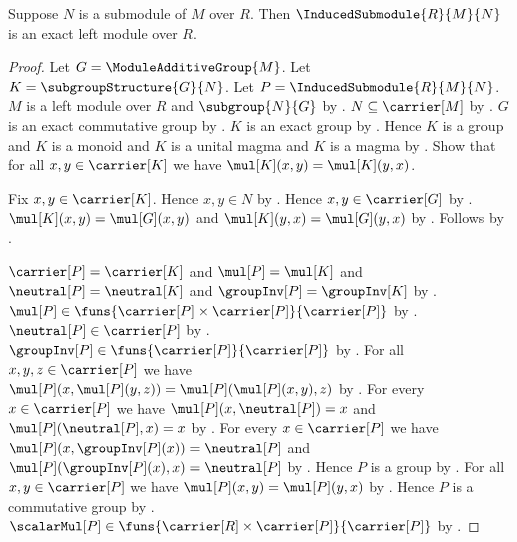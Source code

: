 \begin{theorem}\label{induced_submodule_is_exact}
    Suppose $N$ is a submodule of $M$ over $R$.
    Then $\InducedSubmodule{R}{M}{N}$ is an exact left module over $R$.
\end{theorem}
\begin{proof}
    Let $G=\ModuleAdditiveGroup{M}$.
    Let $K=\subgroupStructure{G}{N}$.
    Let $P=\InducedSubmodule{R}{M}{N}$.
    $M$ is a left module over $R$ and $\subgroup{N}{G}$ by
        .
    $N\subseteq\carrier[M]$ by .
    $G$ is an exact commutative group by
        .
    $K$ is an exact group by
        .
    Hence $K$ is a group and $K$ is a monoid and
        $K$ is a unital magma and $K$ is a magma by
        .
    Show that for all $x,y\in\carrier[K]$ we have
        $\mul[K](x,y)=\mul[K](y,x)$.
    \begin{subproof}
        Fix $x,y\in\carrier[K]$.
        Hence $x,y\in N$ by .
        Hence $x,y\in\carrier[G]$ by
            .
        $\mul[K](x,y)=\mul[G](x,y)$ and
            $\mul[K](y,x)=\mul[G](y,x)$ by
            .
        Follows by .
    \end{subproof}
    $\carrier[P]=\carrier[K]$ and $\mul[P]=\mul[K]$ and
        $\neutral[P]=\neutral[K]$ and $\groupInv[P]=\groupInv[K]$ by
        .
    $\mul[P]\in\funs{\carrier[P]\times\carrier[P]}{\carrier[P]}$ by
        .
    $\neutral[P]\in\carrier[P]$ by .
    $\groupInv[P]\in\funs{\carrier[P]}{\carrier[P]}$ by
        .
    For all $x,y,z\in\carrier[P]$ we have
        $\mul[P](x,\mul[P](y,z))=\mul[P](\mul[P](x,y),z)$ by
        .
    For every $x\in\carrier[P]$ we have
        $\mul[P](x,\neutral[P])=x$ and
        $\mul[P](\neutral[P],x)=x$ by
        .
    For every $x\in\carrier[P]$ we have
        $\mul[P](x,\groupInv[P](x))=\neutral[P]$ and
        $\mul[P](\groupInv[P](x),x)=\neutral[P]$ by
        .
    Hence $P$ is a group by
        .
    For all $x,y\in\carrier[P]$ we have
        $\mul[P](x,y)=\mul[P](y,x)$ by \auto.
    Hence $P$ is a commutative group by
        .
    $\scalarMul[P]\in
        \funs{\carrier[R]\times\carrier[P]}{\carrier[P]}$ by
        .


\end{proof}

